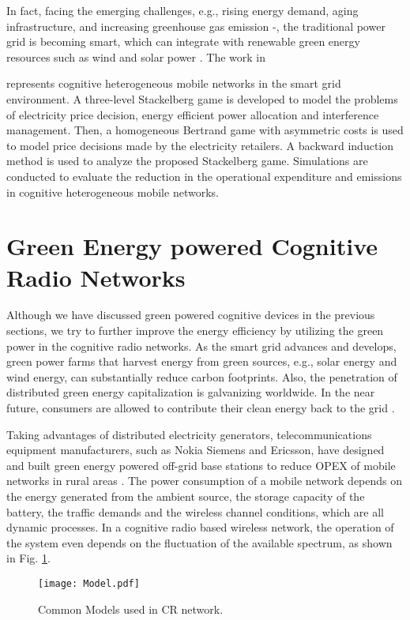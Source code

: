 \documentclass[journal,12pt,onecolumn]{IEEEtran}
\begin{document}
In fact, facing the emerging challenges, e.g., rising energy demand, aging infrastructure, and increasing greenhouse gas emission \cite{pp1} -\cite{pp3}, the traditional power grid is becoming smart, which can integrate with renewable green energy resources such as wind and solar power \cite{solarsmart}. The work in {\cite{smartgrid} represents cognitive heterogeneous mobile networks in the smart grid environment. A three-level Stackelberg game is developed to model the problems of electricity price decision, energy efficient power allocation and interference management. Then, a homogeneous Bertrand game with asymmetric costs is used to model price decisions made by the electricity retailers. A backward induction method is used to analyze the proposed Stackelberg game. Simulations are conducted to evaluate the reduction in the operational expenditure and  emissions in cognitive heterogeneous mobile networks.






\section{Green Energy powered Cognitive Radio Networks}
Although we have discussed green powered cognitive devices in the previous sections, we try to further improve the energy efficiency by utilizing the green power in the cognitive radio networks. As the smart grid advances and develops, green power farms that harvest energy from green sources, e.g., solar energy and wind energy, can substantially reduce carbon footprints. Also, the penetration of distributed green energy capitalization is galvanizing worldwide. In the near future, consumers are allowed to contribute their clean energy back to the grid \cite{NIRWAN}.

Taking advantages of distributed electricity generators, telecommunications equipment manufacturers, such as Nokia Siemens and Ericsson, have designed and built green energy powered off-grid base stations to reduce OPEX of mobile networks in rural areas \cite{Han:2014:PMN}. The power consumption of a mobile network depends on the energy generated from the ambient source, the storage capacity of the battery, the traffic demands and the wireless channel conditions, which are all dynamic processes. In a cognitive radio based wireless network, the operation of the system even depends on the fluctuation of the available spectrum, as shown in Fig. \ref{model_fig}.

\begin{figure}
\centering
\texttt{[image: Model.pdf]}
\caption{Common Models used in CR network.}
\label{model_fig}
\end{figure}

}
\end{document}
